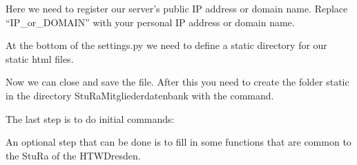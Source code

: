 \documentclass[letterpaper,10pt,english]{sphinxmanual}
\begin{document}
Here we need to register our server’s public IP address or domain name.
Replace “IP\_or\_DOMAIN” with your personal IP address or domain name.
\begin{quote}

\end{quote}

At the bottom of the settings.py we need to define a static directory for our static html files.
\begin{quote}

\end{quote}

Now we can close and save the file.
After this you need to create the folder static in the directory StuRa\sphinxhyphen{}Mitgliederdatenbank
with the command.
\begin{quote}

\end{quote}

The last step is to do initial commands:
\begin{quote}

\begin{DUlineblock}{0em}
\item[] 
\item[] 
\item[] 
\item[] 
\end{DUlineblock}
\end{quote}

An optional step that can be done is to fill in some functions that are common
to the StuRa of the HTW\sphinxhyphen{}Dresden.
\begin{quote}

\begin{DUlineblock}{0em}
\item[] 
\item[] 
\end{DUlineblock}
\end{quote}
\end{document}
